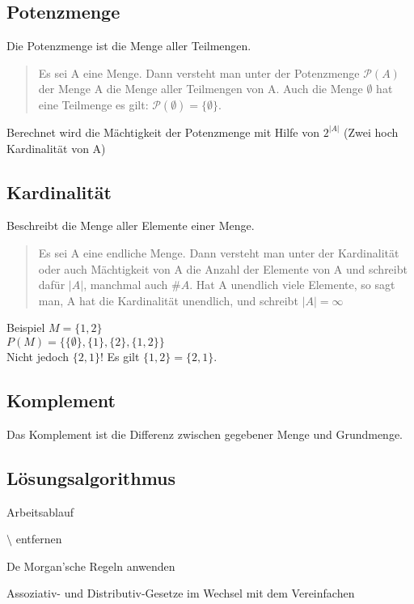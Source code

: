 \documentclass[german]{latex4ei/latex4ei_sheet}
\begin{document}
\begin{sectionbox}
	
\subsection{Potenzmenge}
	Die Potenzmenge ist die Menge aller Teilmengen.
	\begin{quote}
	Es sei A eine Menge. Dann versteht man unter der Potenzmenge $\mathcal{P}(A)$ der Menge A die Menge aller Teilmengen von A. Auch die Menge $\emptyset$ hat eine Teilmenge es gilt: $\mathcal{P}(\emptyset) = \lbrace \emptyset \rbrace$.
	\end{quote}
	
	Berechnet wird die Mächtigkeit der Potenzmenge mit Hilfe von $2^{\vert A \vert}$ (Zwei hoch Kardinalität von A)

\subsection{Kardinalität}
	Beschreibt die Menge aller Elemente einer Menge.
	
	\begin{quote}
	Es sei A eine endliche Menge. Dann versteht man unter der Kardinalität oder auch Mächtigkeit von A die Anzahl der Elemente von A und schreibt dafür $\vert A \vert$, manchmal auch $\#A$. Hat A unendlich viele Elemente, so sagt man, A hat die Kardinalität unendlich, und schreibt $\vert A \vert = \infty$
	\end{quote}
	
	\begin{cookbox}{Beispiel}
		$M = \lbrace 1, 2\rbrace$ \\
		$P\left(M \right) = \lbrace \lbrace \emptyset \rbrace, \lbrace 1 \rbrace, \lbrace 2 \rbrace, \lbrace 1, 2 \rbrace \rbrace $ \\
		Nicht jedoch $\lbrace 2,1 \rbrace$! Es gilt $\lbrace 1,2 \rbrace = \lbrace 2,1 \rbrace$.

	\end{cookbox}

\subsection{Komplement}
	Das Komplement ist die Differenz zwischen gegebener Menge und Grundmenge. 
	
\subsection{Lösungsalgorithmus}
\begin{cookbox}{Arbeitsablauf}
		\item $\setminus$ entfernen
		\item De Morgan'sche Regeln anwenden
		\item Assoziativ- und Distributiv-Gesetze im Wechsel mit dem Vereinfachen
	\end{cookbox}


\end{sectionbox}
\end{document}
